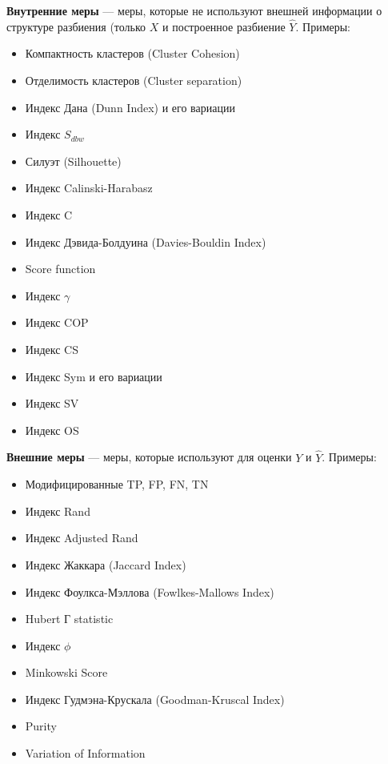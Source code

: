 \begin{definition}
    \textbf{Внутренние меры} --- меры, которые не используют внешней информации о структуре разбиения (только $X$ и построенное разбиение $\widehat{Y}$. Примеры:
    \begin{itemize}
        \item Компактность кластеров (Cluster Cohesion)
        \item Отделимость кластеров (Cluster separation)
        \item Индекс Дана (Dunn Index) и его вариации
        \item Индекс $S_{dbw}$
        \item Силуэт (Silhouette)
        \item Индекс Calinski-Harabasz
        \item Индекс C
        \item Индекс Дэвида-Болдуина (Davies-Bouldin Index)
        \item Score function
        \item Индекс $\gamma$
        \item Индекс COP
        \item Индекс CS
        \item Индекс Sym и его вариации
        \item Индекс SV
        \item Индекс OS
    \end{itemize}
\end{definition}

\begin{definition}
    \textbf{Внешние меры} --- меры, которые используют для оценки $Y$ и $\widehat{Y}$. Примеры:
    \begin{itemize}
        \item Модифицированные TP, FP, FN, TN
        \item Индекс Rand
        \item Индекс Adjusted Rand
        \item Индекс Жаккара (Jaccard Index)
        \item Индекс Фоулкса-Мэллова (Fowlkes-Mallows Index)
        \item Hubert Г statistic
        \item Индекс $\phi$
        \item Minkowski Score
        \item Индекс Гудмэна-Крускала (Goodman-Kruscal Index)
        \item Purity
        \item Variation of Information
    \end{itemize}
\end{definition}

